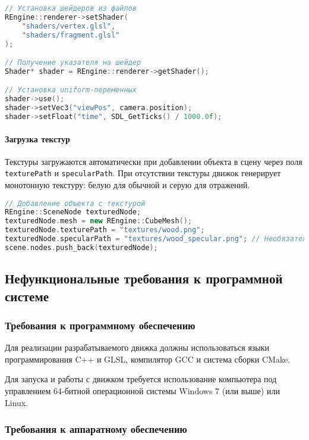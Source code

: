 \begin{lstlisting}[language=C++, caption=Пример настройки шейдеров]
// Установка шейдеров из файлов
REngine::renderer->setShader(
    "shaders/vertex.glsl",
    "shaders/fragment.glsl"
);

// Получение указателя на шейдер
Shader* shader = REngine::renderer->getShader();

// Установка uniform-переменных
shader->use();
shader->setVec3("viewPos", camera.position);
shader->setFloat("time", SDL_GetTicks() / 1000.0f);
\end{lstlisting}

\paragraph{Загрузка текстур}

Текстуры загружаются автоматически при добавлении объекта в сцену через поля \texttt{texturePath} и \texttt{specularPath}. При отсутствии текстуры движок генерирует монотонную текстуру: белую для обычной и серую для отражений.

\begin{lstlisting}[language=C++, caption=Пример загрузки текстур]
// Добавление объекта с текстурой
REngine::SceneNode texturedNode;
texturedNode.mesh = new REngine::CubeMesh();
texturedNode.texturePath = "textures/wood.png";
texturedNode.specularPath = "textures/wood_specular.png"; // Необязательно
scene.nodes.push_back(texturedNode);
\end{lstlisting}

\subsection{Нефункциональные требования к программной системе}

\subsubsection{Требования к программному обеспечению}

Для реализации разрабатываемого движка должны использоваться языки программирования C++ и GLSL, компилятор GCC и система сборки CMake.

Для запуска и работы с движком требуется использование компьютера под управлением 64-битной операционной системы Windows 7 (или выше) или Linux.

\subsubsection{Требования к аппаратному обеспечению}

